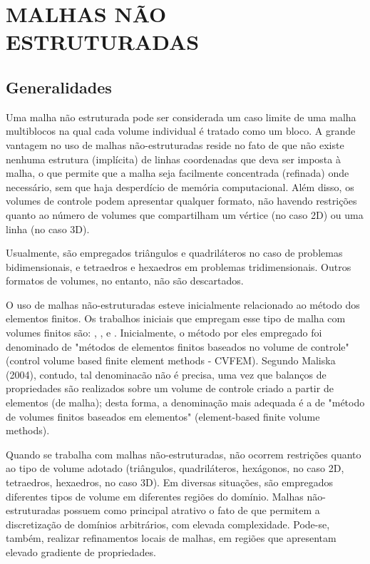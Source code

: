 \chapter[MALHAS NÃO ESTRUTURADAS]{MALHAS NÃO ESTRUTURADAS}
\label{MALHAS NAO ESTRUTURADAS}
\section{Generalidades}

Uma malha não estruturada pode ser considerada um caso limite de uma malha multiblocos na qual cada volume individual é tratado como um bloco. A grande vantagem no uso de malhas não-estruturadas reside no fato de que não existe nenhuma estrutura (implícita) de linhas coordenadas que deva ser imposta à malha, o que permite que a malha seja facilmente concentrada (refinada) onde necessário, sem que haja desperdício de memória computacional. Além disso, os volumes de controle podem apresentar qualquer formato, não havendo restrições quanto ao número de volumes que compartilham um vértice (no caso 2D) ou uma linha (no caso 3D).

Usualmente, são empregados triângulos e quadriláteros no caso de problemas bidimensionais, e tetraedros e hexaedros em problemas tridimensionais. Outros formatos de volumes, no entanto, não são descartados.

O uso de malhas não-estruturadas esteve inicialmente relacionado ao método dos elementos finitos. Os trabalhos iniciais que empregam esse tipo de malha com volumes finitos são: \cite{winslow1966numerical}, \cite{baliga1980new}, \cite{baliga1983solution} e \cite{eiser1985trying}. Inicialmente, o método por eles empregado foi denominado de "métodos de elementos finitos baseados no volume de controle"(control volume based finite element methods - CVFEM). Segundo Maliska (2004), contudo, tal denominacão não é precisa, uma vez que balanços de propriedades são realizados sobre um volume de controle criado a partir de elementos (de malha); desta forma, a denominação mais adequada é a de "método de volumes finitos baseados em elementos" (element-based finite volume methods).

Quando se trabalha com malhas não-estruturadas, não ocorrem restrições quanto ao tipo de volume adotado (triângulos, quadriláteros, hexágonos, no caso 2D, tetraedros, hexaedros, no caso 3D). Em diversas situações, são empregados diferentes tipos de volume em diferentes regiões do domínio. Malhas não-estruturadas possuem como principal atrativo o fato de que permitem a discretização de domínios arbitrários, com elevada complexidade. Pode-se, também, realizar refinamentos locais de malhas, em regiões que apresentam elevado gradiente de propriedades.

